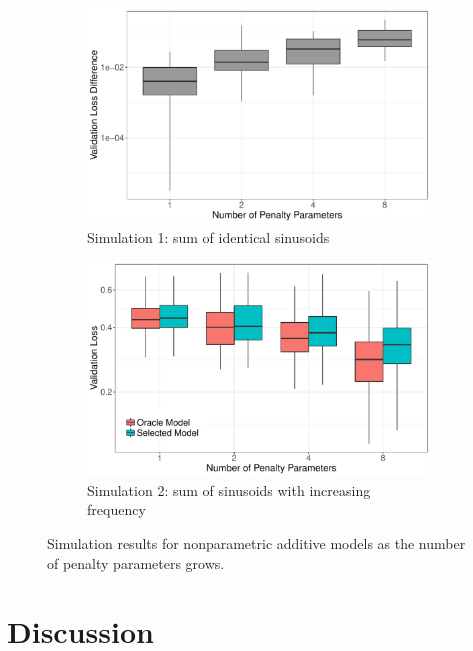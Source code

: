 \documentclass[12pt]{article} %
\theoremstyle{definition}
\begin{document}
\begin{figure}
	\centering
	\begin{subfigure}{0.75\textwidth}
		\includegraphics[width=\textwidth]{../../../R/figures/validation_size_loss_diff_homogeneous.pdf}
		\caption{Simulation 1: sum of identical sinusoids}
	\end{subfigure}
	\begin{subfigure}{0.75\textwidth}
		\includegraphics[width=\textwidth]{../../../R/figures/validation_size_loss_heterogeneous.pdf}
		\caption{Simulation 2: sum of sinusoids with increasing frequency}
	\end{subfigure}
	\caption{
		Simulation results for nonparametric additive models as the number of penalty parameters grows.
	}
	\label{fig:simulations}
\end{figure}

\section{Discussion}\label{sec:discussion}
\end{document}
